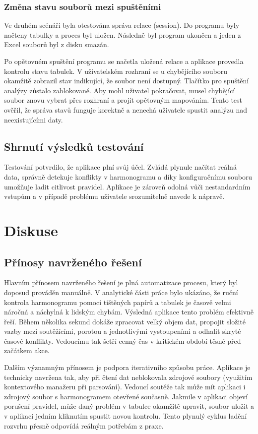 \documentclass[czech, kiv, ba, he, iso690alph, pdf]{fasthesis}
\begin{document}
			\subsection{Změna stavu souborů mezi spuštěními}
				Ve druhém scénáři byla otestována správa relace (session). Do programu byly načteny tabulky a proces byl uložen. Následně byl program ukončen a jeden z Excel souborů byl z disku smazán.

				Po opětovném spuštění programu se načetla uložená relace a aplikace provedla kontrolu stavu tabulek. V uživatelském rozhraní se u chybějícího souboru okamžitě zobrazil stav indikující, že soubor není dostupný. Tlačítko pro spuštění analýzy zůstalo zablokované. Aby mohl uživatel pokračovat, musel chybějící soubor znovu vybrat přes rozhraní a projít opětovným mapováním. Tento test ověřil, že správa stavů funguje korektně a nenechá uživatele spustit analýzu nad neexistujícími daty.

		\section{Shrnutí výsledků testování}
				Testování potvrdilo, že aplikace plní svůj účel. Zvládá plynule načítat reálná data, správně detekuje konflikty v harmonogramu a díky konfiguračnímu souboru umožňuje ladit citlivost pravidel. Aplikace je zároveň odolná vůči nestandardním vstupům a v případě problému uživatele srozumitelně navede k nápravě.


	\chapter{Diskuse}
	
		\section{Přínosy navrženého řešení}
			Hlavním přínosem navrženého řešení je plná automatizace procesu, který byl doposud prováděn manuálně. V analytické části práce bylo ukázáno, že ruční kontrola harmonogramu pomocí tištěných papírů a tabulek je časově velmi náročná a náchylná k lidským chybám. Výsledná aplikace tento problém efektivně řeší. Během několika sekund dokáže zpracovat velký objem dat, propojit složité vazby mezi soutěžícími, porotou a jednotlivými vystoupeními a odhalit skryté časové konflikty. Vedoucímu tak šetří cenný čas v kritickém období těsně před začátkem akce.
	
			Dalším významným přínosem je podpora iterativního způsobu práce. Aplikace je technicky navržena tak, aby při čtení dat neblokovala zdrojové soubory (využitím kontextového manažeru při parsování). Vedoucí soutěže tak může mít aplikaci i zdrojový soubor s harmonogramem otevřené současně. Jakmile v aplikaci objeví porušení pravidel, může daný problém v tabulce okamžitě upravit, soubor uložit a v aplikaci jedním kliknutím spustit novou kontrolu. Tento plynulý cyklus ladění rozvrhu přesně odpovídá reálným potřebám z praxe.
	
\end{document}
